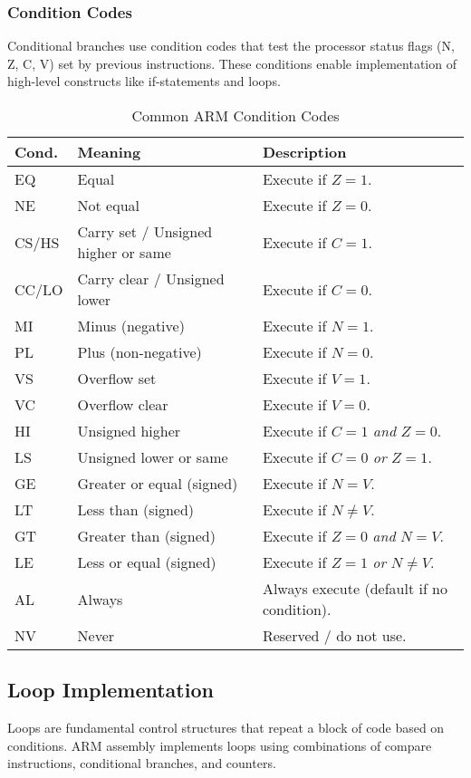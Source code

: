 \subsubsection{Condition Codes}
Conditional branches use condition codes that test the processor status flags (N, Z, C, V) set by previous instructions. These conditions enable implementation of high-level constructs like if-statements and loops.
\begin{table}[H]
\centering
\caption{Common ARM Condition Codes}
\small
\begin{tabularx}{0.72\linewidth}{@{}l l X@{}}
\toprule
\textbf{Cond.} & \textbf{Meaning} & \textbf{Description} \\
\midrule
EQ  & Equal                     & Execute if $Z=1$. \\
NE  & Not equal                 & Execute if $Z=0$. \\
CS/HS & Carry set / Unsigned higher or same & Execute if $C=1$. \\
CC/LO & Carry clear / Unsigned lower        & Execute if $C=0$. \\
MI  & Minus (negative)          & Execute if $N=1$. \\
PL  & Plus (non-negative)       & Execute if $N=0$. \\
VS  & Overflow set              & Execute if $V=1$. \\
VC  & Overflow clear            & Execute if $V=0$. \\
HI  & Unsigned higher           & Execute if $C=1$ \emph{and} $Z=0$. \\
LS  & Unsigned lower or same    & Execute if $C=0$ \emph{or} $Z=1$. \\
GE  & Greater or equal (signed) & Execute if $N=V$. \\
LT  & Less than (signed)        & Execute if $N\neq V$. \\
GT  & Greater than (signed)     & Execute if $Z=0$ \emph{and} $N=V$. \\
LE  & Less or equal (signed)    & Execute if $Z=1$ \emph{or} $N\neq V$. \\
AL  & Always                    & Always execute (default if no condition). \\
NV  & Never                     & Reserved / do not use. \\
\bottomrule
\end{tabularx}
\end{table}
\subsection{Loop Implementation}
Loops are fundamental control structures that repeat a block of code based on conditions. ARM assembly implements loops using combinations of compare instructions, conditional branches, and counters.

